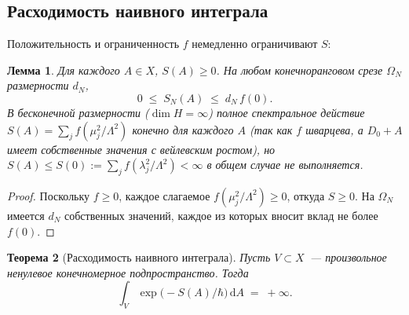 \documentclass[12pt,a4paper]{article}
\theoremstyle{plain}
\newtheorem{theorem}{Теорема}[section]
\newtheorem{lemma}[theorem]{Лемма}
\theoremstyle{definition}
\theoremstyle{remark}
\newcommand{\dd}{\mathrm{d}}
\newcommand{\Lam}{\Lambda}
\begin{document}
\subsection{Расходимость наивного интеграла}

Положительность и ограниченность $f$ немедленно ограничивают $S$:

\begin{lemma}\label{lem:bounded}
Для каждого $A \in X$, $S(A) \ge 0$.  На любом конечноранговом
срезе $\Omega_N$ размерности $d_N$,
\begin{equation}
  0 \;\le\; S_N(A) \;\le\; d_N\,f(0).
\end{equation}
В бесконечной размерности ($\dim H = \infty$) полное спектральное
действие $S(A) = \sum_j f(\mu_j^2/\Lam^2)$ конечно для каждого $A$
(так как $f$ шварцева, а $D_0 + A$ имеет собственные значения с
вейлевским ростом), но $S(A) \le S(0) := \sum_j f(\lambda_j^2/\Lam^2)
< \infty$ в общем случае \emph{не} выполняется.
\end{lemma}

\begin{proof}
Поскольку $f \ge 0$, каждое слагаемое $f(\mu_j^2/\Lam^2) \ge 0$,
откуда $S \ge 0$.  На $\Omega_N$ имеется $d_N$ собственных значений,
каждое из которых вносит вклад не более $f(0)$.
\end{proof}

\begin{theorem}[Расходимость наивного интеграла]
\label{thm:divergence}
Пусть $V \subset X$~--- произвольное ненулевое конечномерное
подпространство.  Тогда
\begin{equation}
  \int_V \exp\!\bigl(-S(A)/\hbar\bigr)\,\dd A \;=\; +\infty.
\end{equation}
\end{theorem}
\end{document}
